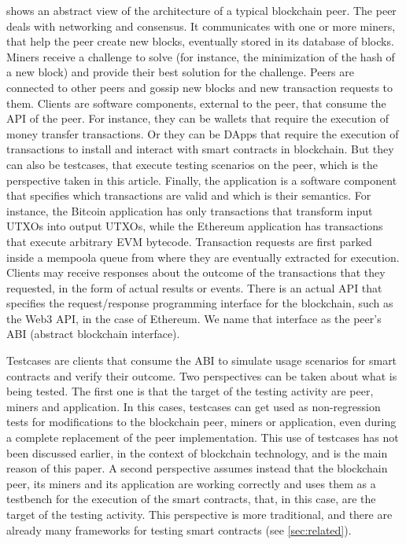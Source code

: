  shows an abstract view of the architecture of
a typical blockchain peer. The peer deals with networking and consensus.
It communicates with one or more miners, that help the peer create new blocks,
eventually stored in its database of blocks. Miners receive a challenge to solve
(for instance, the minimization of the hash of a new block) and provide
their best solution for the challenge. Peers are connected to other peers
and gossip new blocks and new transaction requests to them.
Clients are software
components, external to the peer, that consume the API of the peer.
For instance, they can be wallets that require the execution of money
transfer transactions. Or they can be DApps that require the execution
of transactions to install and interact with smart contracts in blockchain.
But they can also be testcases, that execute testing scenarios on the peer,
which is the perspective taken in this article.
Finally, the application is a software component that specifies which
transactions are valid and which is their semantics. For instance, the Bitcoin
application has only transactions that transform input UTXOs into output
UTXOs, while the Ethereum application has transactions that execute
arbitrary EVM bytecode. Transaction requests are first parked inside a
mempool\ie a queue from where they are eventually extracted for execution.
Clients may receive responses about the outcome of the
transactions that they requested,
in the form of actual results or events. There is an actual API
that specifies the request/response
programming interface for the blockchain, such as the Web3 API,
in the case of Ethereum. We name that interface as the peer's ABI
(abstract blockchain interface).

Testcases are clients that consume the ABI to simulate
usage scenarios for smart contracts and verify their outcome.
Two perspectives can be taken about what is being tested.
The first one is that the target of the testing activity are
peer, miners and application.
In this cases, testcases can get used as non-regression tests
for modifications to the blockchain peer, miners or application, even
during a complete replacement of the peer implementation. This use of
testcases has not been discussed earlier, in the context of blockchain
technology, and is the main reason of this paper.
A second perspective assumes instead that
the blockchain peer, its miners and its application are working correctly
and uses them as a testbench for the execution of the smart contracts, that,
in this case, are the target of the testing activity. This perspective
is more traditional, and there are already many frameworks for testing smart
contracts (see \cref{sec:related}).

